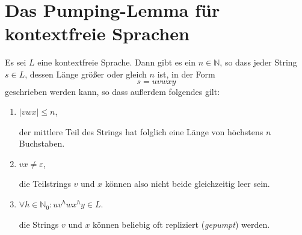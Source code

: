\section{Das Pumping-Lemma f\"ur kontextfreie Sprachen}
\begin{Satz}
Es sei $L$ eine kontextfreie Sprache.  Dann gibt es ein $n \in \mathbb{N}$, so dass jeder String
$s \in L$, dessen L\"ange gr\"o{\ss}er oder gleich $n$ ist, in der Form 
\[ s = uvwxy \]
geschrieben werden kann, so dass au{\ss}erdem folgendes gilt:
\begin{enumerate}
\item $|vwx| \leq n$,

      der mittlere Teil des Strings hat folglich eine L\"ange von h\"ochstens $n$ Buchstaben.
\item $vx \not= \varepsilon$,

      die Teilstrings $v$ und $x$ k\"onnen also nicht beide gleichzeitig leer sein.
\item $\forall h \in \mathbb{N}_0: uv^hwx^hy \in L$.

      die Strings $v$ und $x$ k\"onnen beliebig oft repliziert (\emph{gepumpt}) werden. 
\end{enumerate}
\end{Satz}


